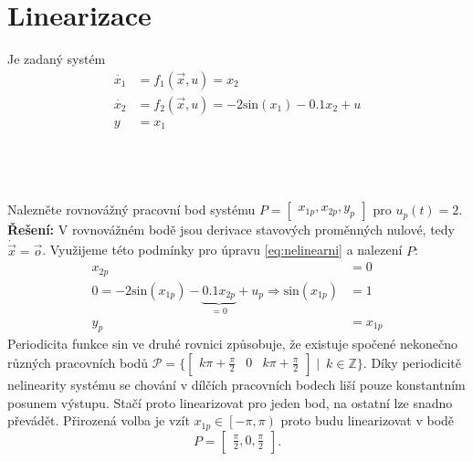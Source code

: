 \documentclass[twoside]{article}
\begin{document}
\section{Linearizace}
\label{sec:ukol3}
Je zadaný systém
\begin{equation}
	\begin{split}
		\dot{x_1} &= f_1(\vec{x}, u) = x_2 \\
		\dot{x_2} &= f_2(\vec{x}, u) = -2 \text{sin}(x_1) - 0.1x_2 +u \\
		y &= x_1
	\end{split}
	\label{eq:nelinearni}
\end{equation}

\subsection{~}
Nalezněte rovnovážný pracovní bod systému $P = \begin{bmatrix} x_{1p}, x_{2p}, y_p \end{bmatrix}$ pro $u_p (t) = 2$. \\
\textbf{Řešení:} V rovnovážném bodě jsou derivace stavových proměnných nulové, tedy $\dot{\vec{x}} = \vec{o}$.
Využijeme této podmínky pro úpravu \eqref{eq:nelinearni} a nalezení $P$:
\begin{equation}
	\begin{split}
		x_{2p} &= 0\\
		0 = -2 \text{sin}(x_{1p}) - \underbrace{0.1x_{2p}}_{=0} +u_p \Rightarrow \text{sin}(x_{1p}) &= 1 \\
		y_p &= x_{1p}
	\end{split}
\end{equation}
Periodicita funkce sin ve druhé rovnici způsobuje, že existuje spočené nekonečno různých pracovních bodů 
$\mathcal{P} = \{\begin{bmatrix} k\pi+\frac{\pi}{2} & 0 & k\pi+\frac{\pi}{2} \end{bmatrix} \mid\ k \in \mathbb{Z} \}$.
Díky periodicitě nelinearity systému se chování v dílčích pracovních bodech liší pouze konstantním posunem výstupu. Stačí proto linearizovat pro jeden bod, na ostatní lze snadno převádět.
Přirozená volba je vzít $x_{1p} \in \left[-\pi,\pi \right)$ proto budu linearizovat v bodě 
\begin{equation*}
	P = \begin{bmatrix} \frac{\pi}{2}, 0, \frac{\pi}{2} \end{bmatrix}.
\end{equation*}
\end{document}
